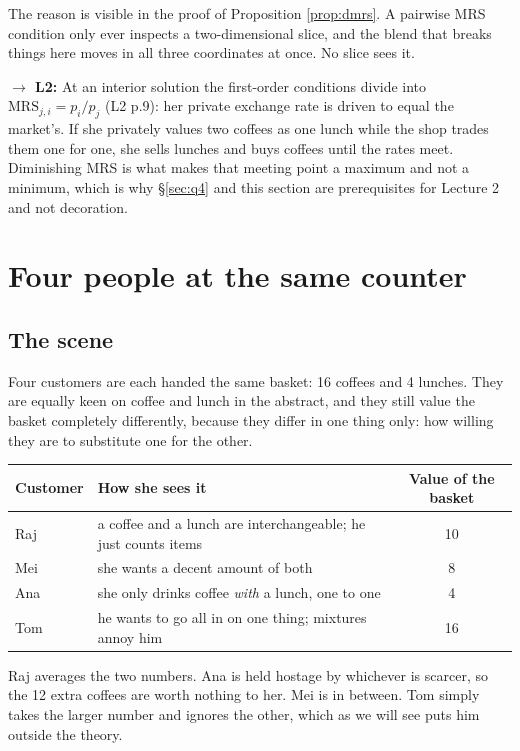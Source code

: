 \documentclass[11pt,letterpaper]{article}
\theoremstyle{definition}
\theoremstyle{plain}
\newcommand{\src}[1]{{\small\textsf{(#1)}}}
\newcommand{\fwd}[1]{\textsf{\textbf{$\rightarrow$ #1:}}}
\newcommand{\MRS}{\mathrm{MRS}}
\begin{document}
The reason is visible in the proof of Proposition \ref{prop:dmrs}. A pairwise MRS condition only ever
inspects a two-dimensional slice, and the blend that breaks things here moves in all three
coordinates at once. No slice sees it.

\fwd{L2} At an interior solution the first-order conditions divide into
$\MRS_{j,i} = p_i / p_j$ \src{L2 p.9}: her private exchange rate is driven to equal the market's. If
she privately values two coffees as one lunch while the shop trades them one for one, she sells
lunches and buys coffees until the rates meet. Diminishing MRS is what makes that meeting point a
maximum and not a minimum, which is why \S\ref{sec:q4} and this section are prerequisites for
Lecture 2 and not decoration.

\section{Four people at the same counter}
\label{sec:q6}

\subsection{The scene}

Four customers are each handed the same basket: 16 coffees and 4 lunches. They are equally keen on
coffee and lunch in the abstract, and they still value the basket completely differently, because
they differ in one thing only: how willing they are to substitute one for the other.

\begin{center}
\begin{tabular}{@{}llc@{}}
\toprule
\textbf{Customer} & \textbf{How she sees it} & \textbf{Value of the basket} \\
\midrule
Raj & a coffee and a lunch are interchangeable; he just counts items & 10 \\
Mei & she wants a decent amount of both & 8 \\
Ana & she only drinks coffee \emph{with} a lunch, one to one & 4 \\
Tom & he wants to go all in on one thing; mixtures annoy him & 16 \\
\bottomrule
\end{tabular}
\end{center}

Raj averages the two numbers. Ana is held hostage by whichever is scarcer, so the 12 extra coffees
are worth nothing to her. Mei is in between. Tom simply takes the larger number and ignores the
other, which as we will see puts him outside the theory.
\end{document}
